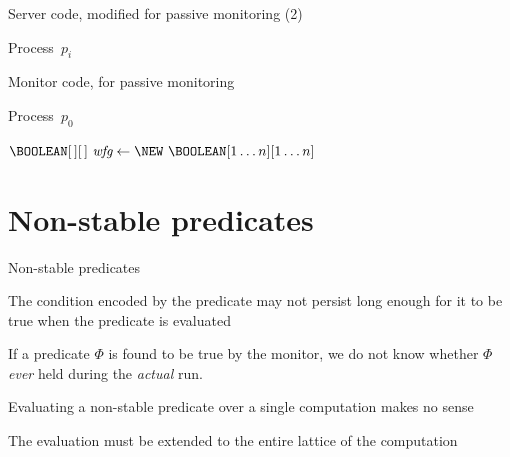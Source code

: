 \begin{frame}[shrink=16]{Server code, modified for passive monitoring (2)}

\vspace{-12pt}
\begin{Procedure}
\caption{Process\ $p_i$}
\end{Procedure}

\end{frame}


\begin{frame}[shrink=16]{Monitor code, for passive monitoring}

\vspace{-12pt}
\begin{Procedure}
\caption{Process\ $p_0$}
  $\BOOLEAN[\,][\,]\ \Wfg \gets \NEW\ \BOOLEAN[1 \ldots n][1 \ldots n]$\;
\end{Procedure}
\end{frame}

\section{Non-stable predicates}

\begin{frame}{Non-stable predicates}
	

\BI
\item The condition encoded by the predicate may not persist long enough for it to 
  be true when the predicate is evaluated
\item If a predicate $\Phi$ is found to be true by the monitor, we do not know whether 
  $\Phi$ \emph{ever} held during the \emph{actual} run.
\EI

\bigskip
{}

\BI
\item Evaluating a non-stable predicate over a single computation makes no sense
\item The evaluation must be extended to the entire lattice of the computation
\EI

\end{frame}

